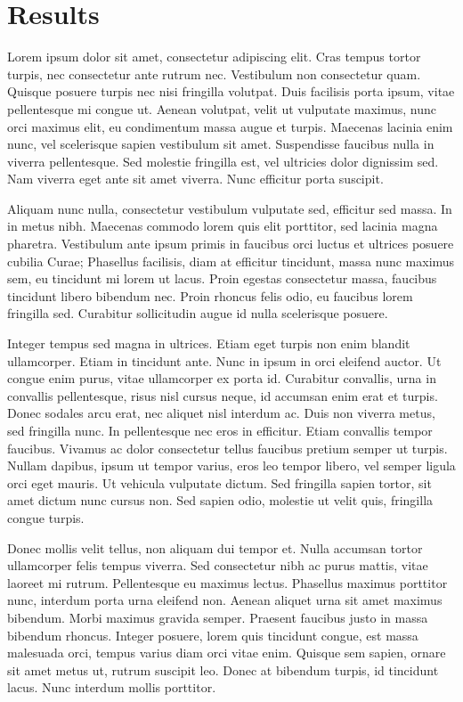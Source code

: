 \section{Results}
Lorem ipsum dolor sit amet, consectetur adipiscing elit. Cras tempus tortor turpis, nec consectetur ante rutrum nec. Vestibulum non consectetur quam. Quisque posuere turpis nec nisi fringilla volutpat. Duis facilisis porta ipsum, vitae pellentesque mi congue ut. Aenean volutpat, velit ut vulputate maximus, nunc orci maximus elit, eu condimentum massa augue et turpis. Maecenas lacinia enim nunc, vel scelerisque sapien vestibulum sit amet. Suspendisse faucibus nulla in viverra pellentesque. Sed molestie fringilla est, vel ultricies dolor dignissim sed. Nam viverra eget ante sit amet viverra. Nunc efficitur porta suscipit.

Aliquam nunc nulla, consectetur vestibulum vulputate sed, efficitur sed massa. In in metus nibh. Maecenas commodo lorem quis elit porttitor, sed lacinia magna pharetra. Vestibulum ante ipsum primis in faucibus orci luctus et ultrices posuere cubilia Curae; Phasellus facilisis, diam at efficitur tincidunt, massa nunc maximus sem, eu tincidunt mi lorem ut lacus. Proin egestas consectetur massa, faucibus tincidunt libero bibendum nec. Proin rhoncus felis odio, eu faucibus lorem fringilla sed. Curabitur sollicitudin augue id nulla scelerisque posuere.

Integer tempus sed magna in ultrices. Etiam eget turpis non enim blandit ullamcorper. Etiam in tincidunt ante. Nunc in ipsum in orci eleifend auctor. Ut congue enim purus, vitae ullamcorper ex porta id. Curabitur convallis, urna in convallis pellentesque, risus nisl cursus neque, id accumsan enim erat et turpis. Donec sodales arcu erat, nec aliquet nisl interdum ac. Duis non viverra metus, sed fringilla nunc. In pellentesque nec eros in efficitur. Etiam convallis tempor faucibus. Vivamus ac dolor consectetur tellus faucibus pretium semper ut turpis. Nullam dapibus, ipsum ut tempor varius, eros leo tempor libero, vel semper ligula orci eget mauris. Ut vehicula vulputate dictum. Sed fringilla sapien tortor, sit amet dictum nunc cursus non. Sed sapien odio, molestie ut velit quis, fringilla congue turpis.

Donec mollis velit tellus, non aliquam dui tempor et. Nulla accumsan tortor ullamcorper felis tempus viverra. Sed consectetur nibh ac purus mattis, vitae laoreet mi rutrum. Pellentesque eu maximus lectus. Phasellus maximus porttitor nunc, interdum porta urna eleifend non. Aenean aliquet urna sit amet maximus bibendum. Morbi maximus gravida semper. Praesent faucibus justo in massa bibendum rhoncus. Integer posuere, lorem quis tincidunt congue, est massa malesuada orci, tempus varius diam orci vitae enim. Quisque sem sapien, ornare sit amet metus ut, rutrum suscipit leo. Donec at bibendum turpis, id tincidunt lacus. Nunc interdum mollis porttitor.


